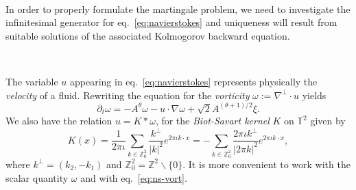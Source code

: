 \documentclass{article}
\newcommand{\assign}{:=}
\newcommand{\nobracket}{}
\newcommand{\tmem}[1]{{\em #1\/}}
\newcommand{\tmtextit}[1]{{\itshape{#1}}}
\begin{document}
\

In order to properly formulate the martingale problem, we need to investigate
the infinitesimal generator for eq.~{\eqref{eq:navierstokes}} and uniqueness
will result from suitable solutions of the associated Kolmogorov backward
equation.

\

The variable $u$ appearing in eq.~{\eqref{eq:navierstokes}} represents
physically the {\tmem{velocity}} of a fluid. Rewriting the equation for the
\tmtextit{vorticity} $\omega \assign \nabla^{\perp} \cdot u$ yields
\begin{equation}
  \partial_t \omega = - A^{\theta} \omega - u \cdot \nabla \omega + \sqrt{2}
  A^{(\theta + 1) / 2} \xi . \label{eq:ns-vort}
\end{equation}
We also have the relation $u = K \ast \omega$, for the {\tmem{Biot-Savart
kernel}} $K$ on $\mathbb{T}^2$ given by
\[ K (x) = \frac{1}{2 \pi \iota}  \sum_{k \in \mathbb{Z}_0^2}
   \frac{k^{\perp}}{| k |^2 \nobracket \nobracket} e^{2 \pi \iota k \cdot x} =
   - \sum_{k \in \mathbb{Z}_0^2} \frac{2 \pi \iota k^{\perp}}{| 2 \pi k |^2
   \nobracket \nobracket} e^{2 \pi \iota k \cdot x}, \]
where $k^{\perp} = (k_2, - k_1)$ and $\mathbb{Z}_0^2 =\mathbb{Z}^2 \backslash
\{ 0 \}$. It is more convenient to work with the scalar quantity $\omega$ and
with eq.~{\eqref{eq:ns-vort}}.

\
\end{document}
